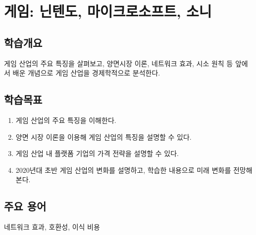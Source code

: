 \chapter{게임: 닌텐도, 마이크로소프트, 소니}\label{cha:videogame}

\section*{학습개요}
게임 산업의 주요 특징을 살펴보고, 양면시장 이론, 네트워크 효과, 시소 원칙 등 앞에서 배운 개념으로 게임 산업을 경제학적으로 분석한다.


\section*{학습목표}
\begin{enumerate}
\item 게임 산업의 주요 특징을 이해한다.
\item 양면 시장 이론을 이용해 게임 산업의 특징을 설명할 수 있다.
\item 게임 산업 내 플랫폼 기업의 가격 전략을 설명할 수 있다.
\item 2020년대 초반 게임 산업의 변화를 설명하고, 학습한 내용으로 미래 변화를 전망해본다.
\end{enumerate}

\section*{주요 용어}
네트워크 효과, 호환성, 이식 비용

\pagebreak

